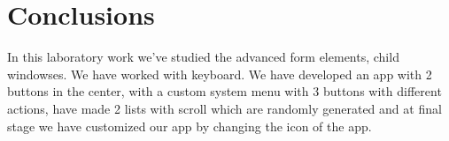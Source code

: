 \section*{Conclusions}

In this laboratory work we've studied the advanced form elements, child windowses. We have worked with keyboard. We have developed an app with 2 buttons in the center, with a custom system menu with 3 buttons with different actions, have made 2 lists with scroll which are randomly generated and at final stage we have customized our app by changing the icon of the app.

\clearpage